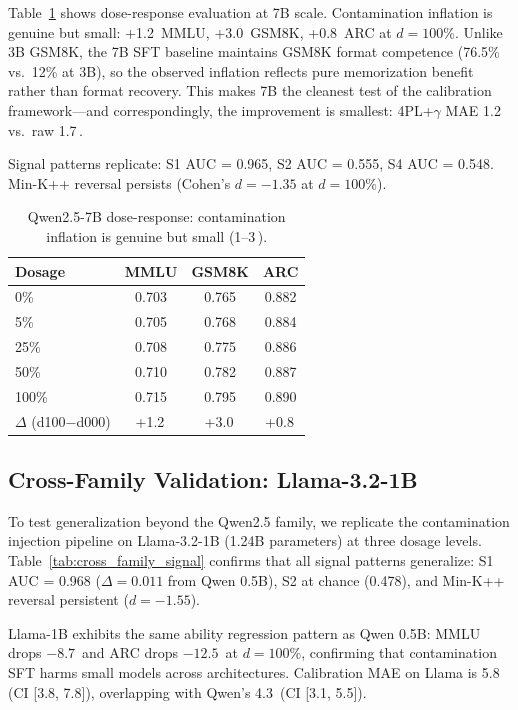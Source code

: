 \documentclass[11pt,a4paper]{article}
\newcommand{\pp}{\,\text{pp}}
\begin{document}
Table~\ref{tab:7b_dose} shows dose-response evaluation at 7B scale. Contamination inflation is genuine but small: +1.2\pp{} MMLU, +3.0\pp{} GSM8K, +0.8\pp{} ARC at $d=100\%$. Unlike 3B GSM8K, the 7B SFT baseline maintains GSM8K format competence (76.5\% vs.\ 12\% at 3B), so the observed inflation reflects pure memorization benefit rather than format recovery. This makes 7B the cleanest test of the calibration framework---and correspondingly, the improvement is smallest: 4PL+$\gamma$ MAE 1.2\pp{} vs.\ raw 1.7\pp{}.

Signal patterns replicate: S1 AUC = 0.965, S2 AUC = 0.555, S4 AUC = 0.548. Min-K++ reversal persists (Cohen's $d = -1.35$ at $d=100\%$).

\begin{table}[t]
\centering
\caption{Qwen2.5-7B dose-response: contamination inflation is genuine but small (1--3\pp{}).}
\label{tab:7b_dose}
\small
\begin{tabular}{lccc}
\toprule
\textbf{Dosage} & \textbf{MMLU} & \textbf{GSM8K} & \textbf{ARC} \\
\midrule
0\%   & 0.703 & 0.765 & 0.882 \\
5\%   & 0.705 & 0.768 & 0.884 \\
25\%  & 0.708 & 0.775 & 0.886 \\
50\%  & 0.710 & 0.782 & 0.887 \\
100\% & 0.715 & 0.795 & 0.890 \\
\midrule
\multicolumn{1}{r}{$\Delta$ (d100$-$d000)} & +1.2\pp{} & +3.0\pp{} & +0.8\pp{} \\
\bottomrule
\end{tabular}
\end{table}

\subsection{Cross-Family Validation: Llama-3.2-1B}
\label{sec:llama_results}

To test generalization beyond the Qwen2.5 family, we replicate the contamination injection pipeline on Llama-3.2-1B (1.24B parameters) at three dosage levels. Table~\ref{tab:cross_family_signal} confirms that all signal patterns generalize: S1 AUC = 0.968 ($\Delta = 0.011$ from Qwen 0.5B), S2 at chance (0.478), and Min-K++ reversal persistent ($d = -1.55$).

Llama-1B exhibits the same ability regression pattern as Qwen 0.5B: MMLU drops $-8.7$\pp{} and ARC drops $-12.5$\pp{} at $d=100\%$, confirming that contamination SFT harms small models across architectures. Calibration MAE on Llama is 5.8\pp{} (CI [3.8, 7.8]), overlapping with Qwen's 4.3\pp{} (CI [3.1, 5.5]).
\end{document}
